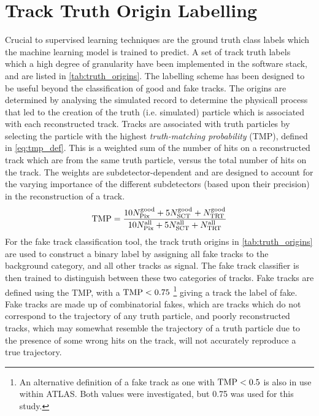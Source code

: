 \section{Track Truth Origin Labelling}\label{sec:track_labelling}

Crucial to supervised learning techniques are the ground truth class labels which the machine learning model is trained to predict.
A set of track truth labels which a high degree of granularity have been implemented in the \ATLAS software stack, and are listed in \cref{tab:truth_origins}.
The labelling scheme has been designed to be useful beyond the classification of good and fake tracks.
The origins are determined by analysing the simulated record to determine the physicall process that led to the creation of the truth (i.e. simulated) particle which is  associated with each reconstructed track.
Tracks are associated with truth particles by selecting the particle with the highest \textit{truth-matching probability} (TMP), defined in \cref{eq:tmp_def}.
This is a weighted sum of the number of hits on a reconstructed track which are from the same truth particle, versus the total number of hits on the track.
The weights are subdetector-dependent and are designed to account for the varying importance of the different subdetectors (based upon their precision) in the reconstruction of a track.
%
\begin{equation}\label{eq:tmp_def}
    \textnormal{TMP} = 
    \frac{
        10 N_{\textnormal{Pix}}^{\textnormal{good}} + 
        5  N_{\textnormal{SCT}}^{\textnormal{good}} + 
           N_{\textnormal{TRT}}^{\textnormal{good}}
        }{
        10 N_{\textnormal{Pix}}^{\textnormal{all}} + 
        5  N_{\textnormal{SCT}}^{\textnormal{all}} + 
            N_{\textnormal{TRT}}^{\textnormal{all}}
        }
\end{equation}
%
For the fake track classification tool, the track truth origins in \cref{tab:truth_origins} are used to construct a binary label by assigning all fake tracks to the background category, and all other tracks as signal.
The fake track classifier is then trained to distinguish between these two categories of tracks.
Fake tracks are defined using the TMP, with a $\textnormal{TMP} < 0.75$
\footnote{An alternative definition of a fake track as one with $\textnormal{TMP} < 0.5$ is also in use within ATLAS. Both values were investigated, but 0.75 was used for this study.} 
giving a track the label of fake.
Fake tracks are made up of combinatorial fakes, which are tracks which do not correspond to the trajectory of any truth particle, and poorly reconstructed tracks, which may somewhat resemble the trajectory of a truth particle due to the presence of some wrong hits on the track, will not accurately reproduce a true trajectory.



